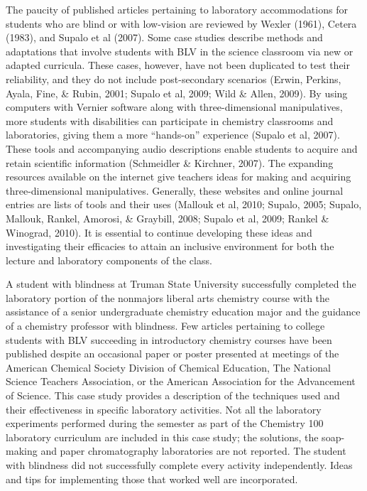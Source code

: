 \documentclass[11.5pt]{sig-alternate} %
\begin{document}
\begin{large}
The paucity of published articles pertaining to laboratory accommodations for students who are blind or with low-vision are reviewed by Wexler (1961), Cetera (1983), and Supalo et al (2007). Some case studies describe methods and adaptations that involve students with BLV in the science classroom via new or adapted curricula. These cases, however, have not been duplicated to test their reliability, and they do not include post-secondary scenarios (Erwin, Perkins, Ayala, Fine, \& Rubin, 2001; Supalo et al, 2009; Wild \& Allen, 2009). By using computers with Vernier software along with three-dimensional manipulatives, more students with disabilities can participate in chemistry classrooms and laboratories, giving them a more “hands-on” experience (Supalo et al, 2007). These tools and accompanying audio descriptions enable students to acquire and retain scientific information (Schmeidler \& Kirchner, 2007). The expanding resources available on the internet give teachers ideas for making and acquiring three-dimensional manipulatives. Generally, these websites and online journal entries are lists of tools and their uses (Mallouk et al, 2010; Supalo, 2005; Supalo, Mallouk, Rankel, Amorosi, \& Graybill, 2008; Supalo et al, 2009; Rankel \& Winograd, 2010). It is essential to continue developing these ideas and investigating their efficacies to attain an inclusive environment for both the lecture and laboratory components of the class. 
 
A student with blindness at Truman State University successfully completed the laboratory portion of the nonmajors liberal arts chemistry course with the assistance of a senior undergraduate chemistry education major and the guidance of a chemistry professor with blindness. Few articles pertaining to college students with BLV succeeding in introductory chemistry courses have been published despite an occasional paper or poster presented at meetings of the American Chemical Society Division of Chemical Education, The National Science Teachers Association, or the American Association for the Advancement of Science. This case study provides a description of the techniques used and their effectiveness in specific laboratory activities. Not all the laboratory experiments performed during the semester as part of the Chemistry 100 laboratory curriculum are included in this case study; the solutions, the soap-making and paper chromatography laboratories are not reported. The student with blindness did not successfully complete every activity independently. Ideas and tips for implementing those that worked well are incorporated. 


\end{large}
\end{document}
